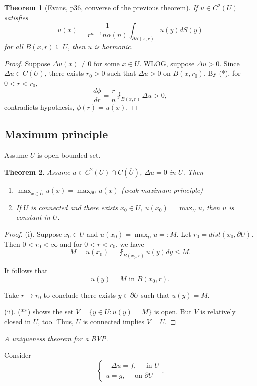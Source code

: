 \documentclass[11pt]{amsart}%
\newtheorem{theorem}{Theorem}
\begin{document}
\begin{theorem}[Evans, p36, converse of the previous theorem]
    If $u\in C^2(U)$ satisfies $$u(x)=\frac{1}{r^{n-1}n\alpha(n)}\int_{\partial B(x,r)} u(y)dS(y)$$ for all $B(x,r)\subseteq U$, then $u$ is harmonic.
\end{theorem}

\begin{proof}
    Suppose $\Delta u(x)\not=0$ for some $x\in U$. WLOG, suppose $\Delta u>0$. Since $\Delta u\in C(U)$, there exists $r_0>0$ such that $\Delta u>0$ on $B(x,r_0)$. By (*), for $0<r<r_0$,
    $$\frac{d\phi}{dr} = \frac{r}{n} \fint_{B(x,r)} \Delta u>0,$$ contradicts hypothesis, $\phi(r)=u(x)$.
\end{proof}

\subsection*{Maximum principle}
Assume $U$ is open bounded set.
\begin{theorem}
    Assume $u\in C^2(U)\cap C(\overline{U})$, $\Delta u =0$ in $U$. Then
    \begin{enumerate}
        \item $\max_{x\in \overline{U}} u(x) = \max_{\partial U} u(x)$ (weak maximum principle)
        \item If $U$ is connected and there exists $x_0\in U$, $u(x_0)=\max_{\overline{U}} u$, then $u$ is constant in $U$.
    \end{enumerate}
\end{theorem}

\begin{proof}
    (i). Suppose $x_0\in U$ and $u(x_0)=\max_{\overline{U}} u =:M$. Let $r_0 = dist(x_0,\partial U)$. Then $0<r_0<\infty$ and for $0<r<r_0$, we have
    $$M=u(x_0) = \fint_{B(x_0,r)} u(y)dy \le M.$$
    
    It follows that
    \[ u(y)=M \text{ in }B(x_0,r). \tag{**}\]
    
    Take $r\to r_0$ to conclude there exists $y\in \partial U$ such that $u(y)=M$.
    
    (ii). (**) shows the set $V=\{ y\in U: u(y) =M\}$ is open. But $V$ is relatively closed in $U$, too. Thus, $U$ is connected implies $V=U$.
\end{proof}

\emph{A uniqueness theorem for a BVP.}

Consider \[\begin{cases}
    -\Delta u = f, \quad \text{ in $U$}\\
    u=g, \quad \text{ on $\partial U$}
\end{cases}. \tag{BVP}\]
\end{document}
